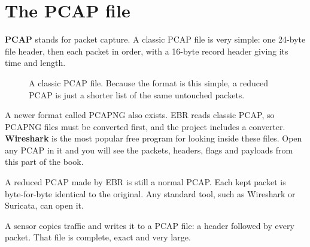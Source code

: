 \section{The PCAP file}
\textbf{PCAP} stands for packet capture. A classic PCAP file is very simple: one 24-byte file header, then each packet in order, with a 16-byte record header giving its time and length.

\begin{figure}[H]
\centering
{}
\caption{A classic PCAP file. Because the format is this simple, a reduced PCAP is just a shorter list of the same untouched packets.}
\end{figure}

A newer format called PCAPNG also exists. EBR reads classic PCAP, so PCAPNG files must be converted first, and the project includes a converter. \textbf{Wireshark} is the most popular free program for looking inside these files. Open any PCAP in it and you will see the packets, headers, flags and payloads from this part of the book.

\begin{bigidea}
A reduced PCAP made by EBR is still a normal PCAP. Each kept packet is byte-for-byte identical to the original. Any standard tool, such as Wireshark or Suricata, can open it.
\end{bigidea}

\begin{recap}
A sensor copies traffic and writes it to a PCAP file: a header followed by every packet. That file is complete, exact and very large.
\end{recap}
